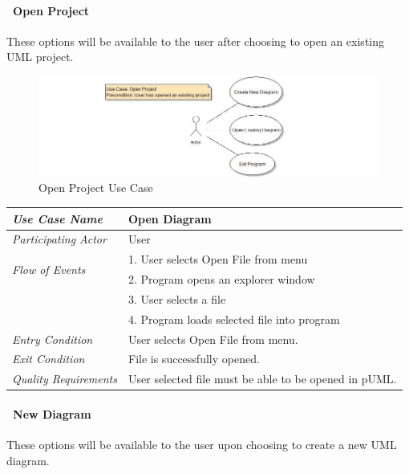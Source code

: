 \documentclass[twoside,letterpaper]{article}
\begin{document}
\clearpage


\paragraph[\ Use Category]
{\ Open Project} {These options will be available to the user after choosing to open an existing UML project.}

\begin{figure}[h]
\centering
\includegraphics[width=6.0in]{ucaseOpenProj.jpg}
\caption{Open Project Use Case}
\end{figure}

\begin{flushleft}
\tablehead{}
\begin{tabular}{|m{2.0in} m{5.0in}|}
\hline
{\bfseries\emph{Use Case Name}}
& {\bfseries Open Diagram}
\\\hline
\emph{Participating Actor}
& User
\\\hline
\multirow{2}{*}{\emph{Flow of Events}}
& 1. User selects Open File from menu \\
& 2. Program opens an explorer window \\
& 3. User selects a file \\
& 4. Program loads selected file into program \\\hline
\emph{Entry Condition}
& User selects Open File from menu.
\\\hline
\emph{Exit Condition}
& File is successfully opened.
\\\hline
\emph{Quality Requirements}
& User selected file must be able to be opened in pUML.
\\\hline
\end{tabular}
\end{flushleft}
\bigskip

\clearpage

\paragraph[\ Use Category]
{\ New Diagram} {These options will be available to the user upon choosing to create a new UML diagram.}
\end{document}
